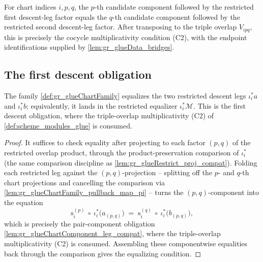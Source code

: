 \begin{lemma}\leanok
  \label{lem:gr_glueChartComponent_leg_compat}
  For chart indices \(i,p,q\), the \(p\)-th candidate component followed by the
  restricted first descent-leg factor equals the \(q\)-th candidate component followed
  by the restricted second descent-leg factor.  After transposing to the triple overlap
  \(V_{ipq}\), this is precisely the cocycle multiplicativity condition (C2), with the
  endpoint identifications supplied by \cref{lem:gr_glueData_bridges}.
\end{lemma}


\subsection{The first descent obligation}

\begin{lemma}\leanok
  \label{lem:gr_glueChartFamily_equalizes}
  The family \cref{def:gr_glueChartFamily} equalizes the two restricted descent legs
  \(\iota_i^{*}a\) and \(\iota_i^{*}b\); equivalently, it lands in the restricted
  equalizer \(\iota_i^{*}\mathcal{M}\). This is the first descent obligation, where the
  triple-overlap multiplicativity (C2) of \cref{def:scheme_modules_glue} is consumed.
\end{lemma}
\begin{proof}
    \leanok
  It suffices to check equality after projecting to each factor \((p,q)\) of the
  restricted overlap product, through the product-preservation comparison of
  \(\iota_i^{*}\) (the same comparison discipline as \cref{lem:gr_glueRestrict_proj_compat}).
  Folding each restricted leg against the \((p,q)\)-projection -- splitting off the
  \(p\)- and \(q\)-th chart projections and cancelling the comparison via
  \cref{lem:gr_glueChartFamily_pullback_map_pi} -- turns the \((p,q)\)-component into the
  equation
  \[
    \mathrm{s}_i^{(p)}\ \circ\ \iota_i^{*}\bigl(a_{(p,q)}\bigr)
      \;=\;
    \mathrm{s}_i^{(q)}\ \circ\ \iota_i^{*}\bigl(b_{(p,q)}\bigr),
  \]
  which is precisely the pair-component obligation
  \cref{lem:gr_glueChartComponent_leg_compat}, where the triple-overlap multiplicativity
  (C2) is consumed. Assembling these componentwise equalities back through the comparison
  gives the equalizing condition.
\end{proof}

